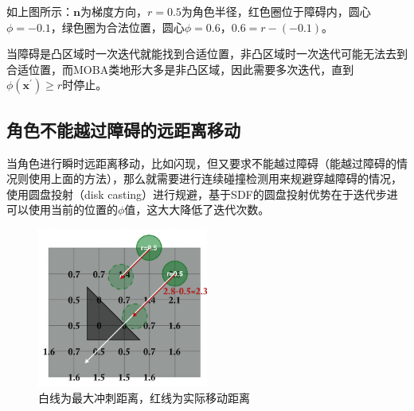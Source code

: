 如上图所示：\(\mathbf{n}\)为梯度方向，\(r=0.5\)为角色半径，红色圈位于障碍内，圆心\(\phi=-0.1\)，绿色圈为合法位置，圆心\(\phi=0.6\)，\(0.6 = r - (-0.1)\)。

当障碍是凸区域时一次迭代就能找到合适位置，非凸区域时一次迭代可能无法去到合适位置，而MOBA类地形大多是非凸区域，因此需要多次迭代，直到\(\phi(\mathbf{x}^{\prime}) \geq r\)时停止。

\begin{Shaded}
\begin{Highlighting}[]
\NormalTok{ (}
        \NormalTok{;}
\NormalTok{\}}
\end{Highlighting}
\end{Shaded}

\hypertarget{ux89d2ux8272ux4e0dux80fdux8d8aux8fc7ux969cux788dux7684ux8fdcux8dddux79bbux79fbux52a8}{%
\subsection{角色不能越过障碍的远距离移动}\label{ux89d2ux8272ux4e0dux80fdux8d8aux8fc7ux969cux788dux7684ux8fdcux8dddux79bbux79fbux52a8}}

当角色进行瞬时远距离移动，比如闪现，但又要求不能越过障碍（能越过障碍的情况则使用上面的方法），那么就需要进行连续碰撞检测用来规避穿越障碍的情况，使用圆盘投射（disk
casting）进行规避，基于SDF的圆盘投射优势在于迭代步进可以使用当前的位置的\(\phi\)值，这大大降低了迭代次数。

\begin{figure}
\centering
\includegraphics[width=0.5\textwidth,height=\textheight]{diskcast.png}
\caption{白线为最大冲刺距离，红线为实际移动距离}
\end{figure}

